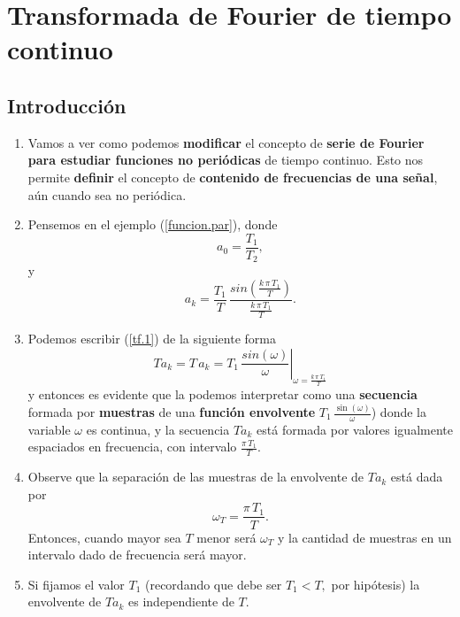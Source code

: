\chapter{Transformada de Fourier de tiempo continuo}

\section{Introducci\'{o}n}

\begin{enumerate}

\item   Vamos a ver como podemos \textbf{modificar} el concepto de \textbf{serie de Fourier} \textbf{para estudiar funciones no peri\'{o}dicas} de tiempo continuo.  
Esto nos permite \textbf{definir} el concepto de \textbf{contenido de frecuencias de una se\~{n}al}, a\'{u}n cuando sea no peri\'{o}dica.

\item   Pensemos en el ejemplo (\ref{funcion.par}), donde
\begin{equation}
	a_{0} = \frac{T_{1}}{T_{2}},
\end{equation}
y
\begin{equation}
	a_{k} =  \frac{T_{1}}{T} \, \frac{sin(\frac{k \, \pi \, T_{1}}{T})}{\frac{k \, \pi \, T_{1}}{T}}
	. \label{tf.1}
\end{equation}
\item  Podemos escribir (\ref{tf.1}) de la siguiente forma
        \begin{equation}
           T a_{k}=
	T \, a_{k} =  \left. T_{1} \, \frac{sin(\omega)}{\omega} \right|_{\omega = \frac{k \, \pi \, T_{1}}{T}}
        \end{equation}
        y entonces es evidente que la podemos interpretar como una \textbf{secuencia} formada por \textbf{muestras} de una \textbf{funci\'{o}n envolvente} $T_{1} \, \frac{\sin(\omega)}{\omega}$) donde la variable $\omega $ es continua, y 
        la secuencia $T a_{k}$ está formada por valores igualmente espaciados en 
        frecuencia, con intervalo $\frac{\pi \, T_{1}}{T}$.
        
        \item   Observe que la separaci\'{o}n de las muestras de la envolvente de $T a_{k}$ est\'{a} dada 
        por 
        \begin{equation}
                \omega_{T} = \frac{\pi \, T_{1}}{T}.
        \end{equation}
        Entonces, cuando mayor sea $T$ menor ser\'{a} $\omega_{T}$ y la cantidad de muestras en un intervalo dado de frecuencia ser\'{a} mayor.

        \item  Si fijamos el valor $T_{1}$ (recordando que debe ser $T_{1}<T,$ por hip\'{o}tesis) la envolvente de $T a_{k}$ es independiente de $T$.
\end{enumerate}

